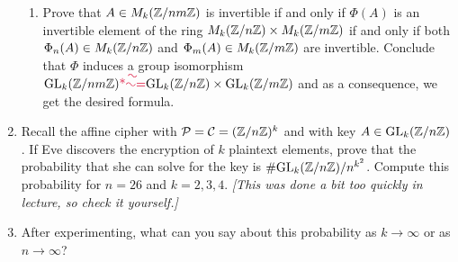 \begin{problem}
\begin{enumerate}
\begin{enumerate}
\item Prove that $A \in M_k(\mathbb{Z}/nm\mathbb{Z})$ is invertible if and only if
  $\Phi(A)$ is an invertible element of the ring $M_k(\mathbb{Z}/n\mathbb{Z}) \times M_k(\mathbb{Z}/m\mathbb{Z})$ if and
  only if both $\Phi_n(A) \in M_k(\mathbb{Z}/n\mathbb{Z})$ and $\Phi_m(A) \in
  M_k(\mathbb{Z}/m\mathbb{Z})$ are invertible.  Conclude that $\Phi$ induces a group
  isomorphism $\GL_k(\Z/nm\Z) \crim{\isom} \GL_k(\Z/n\Z) \times
  \GL_k(\Z/m\Z)$ and as a consequence, we get the desired formula.
\end{enumerate}

\item Recall the affine cipher with $\mathcal{P} = \mathcal{C} = (\mathbb{Z}/n\mathbb{Z})^k$ and
with key $A \in \mathrm{GL}_k(\mathbb{Z}/n\mathbb{Z})$.  If Eve discovers the encryption of
$k$ plaintext elements, prove that the probability that she can solve
for the key is $\#\mathrm{GL}_k(\mathbb{Z}/n\mathbb{Z})/n^{k^2}$.  Compute this probability
for $n=26$ and $k=2,3,4$.  \emph{[This was done a bit too quickly in
lecture, so check it yourself.]}

\item After experimenting, what can you say about this probability as $k \to \infty$ or as
$n\to \infty$?
\end{enumerate}
\end{problem}

